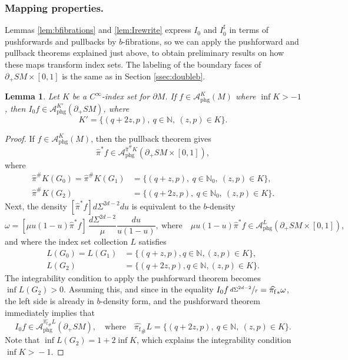 \documentclass[JEP,XML,SOM,Unicode,NoFloatCountersInSection, NoEqCountersInSection,published]{cedram}
\theoremstyle{plain}
\newtheorem{Lemma}[Theorem]{Lemma}
\theoremstyle{definition}
\theoremstyle{remark}
\def\Nm{{\mathbb{N}}}
\def\A{\mathcal{A}}
\newcommand{\adj}{I_0^\sharp}
\newcommand{\hpi}{\widehat{\pi}}
\newcommand{\phg}{\mathrm{phg}}
\newcommand{\foot}{{\pi_{\mathrm f}}}
\newcommand{\hF}{\widehat{\foot}}
\begin{document}
\subsubsection*{Mapping properties.} Lemmas \ref{lem:bfibrations} and \ref{lem:Irewrite} express $I_0$ and $\adj $ in terms of pushforwards and pullbacks by $b$-fibrations, so we can apply the pushforward and pullback theorems explained just above, to obtain preliminary results on how these maps transform index sets. The labeling of the boundary faces of $\partial_+ SM\times [0,1]$ is the same as in Section \ref{ssec:doubleb}.

\begin{Lemma}\label{lem:xray}
Let $K$ be a $C^\infty$-index set for $\partial M$. If $f\in \A_{\phg}^K (M)$ where $\inf K >-1$, then $I_0 f \in \A_{\phg}^{K'}(\partial_+ SM)$, where\vspace*{-3pt}
\begin{equation*}
K' = \{(q + 2z, p),\ q\in \Nm,\ (z,p)\in K\}.
\end{equation*}
\end{Lemma}
\begin{proof}
If $f\in \A_{\phg}^K(M)$, then the pullback theorem gives\vspace*{-3pt}
\begin{equation*}
\hpi^* f \in \A_{\phg}^{\hpi^\# K}(\partial_+ SM\times [0,1]),
\end{equation*}
where\vspace*{-3pt}
\begin{align*}
\hpi^\# K (G_0) = \hpi^\# K (G_1) &= \{(q + z, p),\ q\in \Nm_0,\ (z,p)\in K\},\\
\hpi^\# K (G_2) &= \{(q + 2z, p),\ q\in \Nm_0,\ (z,p)\in K\}.
\end{align*}
Next, the density $[\hpi^* f]d\Sigma^{2d-2} du$ is equivalent to the $b$-density\vspace*{-3pt}
\begin{equation*}
\omega = [\mu u(1-u) \hpi^* f]\, \frac{d\Sigma^{2d-2}}{\mu} \frac{du}{u(1-u)}, \ \text{where} \quad \mu u(1-u) \hpi^* f \in \A_{\phg}^L (\partial_+ SM \times [0,1]),
\end{equation*}
and where the index set collection $L$ satisfies\vspace*{-3pt}
\begin{align*}
L(G_0) = L(G_1) &= \{(q + z, p), q\in \Nm, (z,p)\in K\}, \\
L(G_2) &= \{(q + 2z, p), q\in \Nm, (z,p)\in K\}.
\end{align*}
The integrability condition to apply the pushforward theorem becomes $\inf L(G_2) > 0$. Assuming this, and since in the equality $I_0 f\, \sfrac{d\Sigma^{2d-2}}{\tau} = \hF_* \omega$, the left side is already in $b$-density form, and the pushforward theorem immediately implies that
\begin{equation*}
I_0 f \in \A_{\phg}^{\hF_\# L} (\partial_+ SM), \quad \text{where} \quad \hF_\# L = \{(q + 2z, p),\ q\in \Nm,\ (z,p)\in K\}.
\end{equation*}
Note that $\inf L(G_2) \!=\! 1 + 2 \inf K$, which explains the integrability condition \hbox{$\inf K \!>\! -1$}.
\end{proof}
\end{document}
